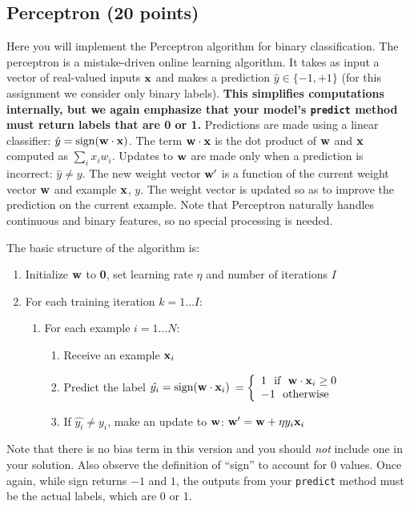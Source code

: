 \documentclass[11pt]{article}
\newcommand{\vw}{{\bf w}}
\newcommand{\vx}{{\bf x}}
\newcommand{\vxi}{{\bf x}_i}
\newcommand{\yi}{y_i}
\newcommand{\yh}{\hat{y}}
\begin{document}
	\subsection{Perceptron (20 points)}
	Here you will implement the Perceptron algorithm for binary classification. The perceptron is a mistake-driven online learning algorithm. It takes as input a vector of real-valued inputs $\vx$ and makes a prediction $\yh \in \{-1,+1\}$ (for this assignment we consider only binary labels). \textbf{This simplifies computations internally, but we again emphasize that your model's \texttt{predict} method must return labels that are 0 or 1.} Predictions are made using a linear classifier: $\yh = \textrm{sign}(\vw \cdot \vx)$. The term $\vw \cdot \vx$ is the dot product of $\vw$ and $\vx$ computed as $\sum_i x_i  w_i$. Updates to $\vw$ are made only when a prediction is incorrect: $\yh \ne y$. The new weight vector $\vw'$ is a function of the current weight vector $\vw$ and example $\vx$, $y$. The weight vector is updated so as to improve the prediction on the current example. Note that Perceptron naturally handles continuous and binary features, so no special processing is needed.
	
	The basic structure of the algorithm is:
	\begin{enumerate}
		\item Initialize $\vw$ to {\bf 0}, set learning rate $\eta$ and number of iterations $I$
		\item For each training iteration $k = 1 \ldots I$:
		\begin{enumerate}
			\item For each example $i=1\ldots N$:
			\begin{enumerate}
				\item Receive an example $\vxi$
				\item Predict the label $\hat{\yi} =  \textrm{sign}(\vw \cdot \vxi)$
				$=\left\{
				\begin{array}{lr}
				1 ~~  \textrm{if} ~~ \vw \cdot \vxi \ge 0  \\
				-1 ~~ \textrm{otherwise}
				\end{array}
				\right.$
				\item If  $\hat{\yi} \ne \yi$, make an update to $\vw$: $\vw' = \vw + \eta \yi \vxi$
			\end{enumerate}
		\end{enumerate}
	\end{enumerate}
	
	Note that there is no bias term in this version and you should \emph{not} include one in your solution. Also observe the definition of ``sign'' to account for 0 values. Once again, while sign returns $-1$ and $1$, the outputs from your \texttt{predict} method must be the actual labels, which are 0 or 1.
	
\end{document}
